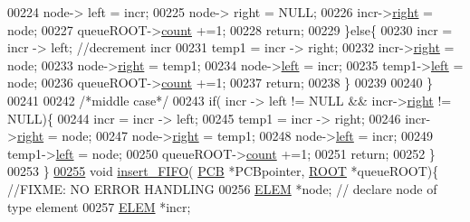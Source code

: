 \begin{DoxyCode}
{{00224                         node-> left = incr;
00225                         node-> right = NULL;
00226                         incr->\hyperlink{structpage_a59bb1b5eca2d579befcc93a2833f4dfd}{right} = node;
00227                         queueROOT->\hyperlink{structroot_afa78d0408d4af29e936332a04739d59c}{count} +=1;
00228                         \textcolor{keywordflow}{return};
00229                 \}\textcolor{keywordflow}{else}\{
00230                         incr = incr -> left; \textcolor{comment}{//decrement incr}
00231                         temp1 = incr -> right;
00232                         incr->\hyperlink{structpage_a59bb1b5eca2d579befcc93a2833f4dfd}{right} = node;
00233                         node->\hyperlink{structpage_a59bb1b5eca2d579befcc93a2833f4dfd}{right} = temp1;
00234                         node->\hyperlink{structpage_a450d16b8cb803158a4dab05bb36fd7f5}{left} = incr;
00235                         temp1->\hyperlink{structpage_a450d16b8cb803158a4dab05bb36fd7f5}{left} = node;
00236                         queueROOT->\hyperlink{structroot_afa78d0408d4af29e936332a04739d59c}{count} +=1;
00237                         \textcolor{keywordflow}{return};
00238                 \}
00239                 
00240         \}
00241         
00242         \textcolor{comment}{/*middle case*/}
00243         \textcolor{keywordflow}{if}( incr -> left != NULL && incr->\hyperlink{structpage_a59bb1b5eca2d579befcc93a2833f4dfd}{right} != NULL)\{
00244                 incr = incr -> left;
00245                 temp1 = incr -> right;
00246                 incr->\hyperlink{structpage_a59bb1b5eca2d579befcc93a2833f4dfd}{right} = node;
00247                 node->\hyperlink{structpage_a59bb1b5eca2d579befcc93a2833f4dfd}{right} = temp1;
00248                 node->\hyperlink{structpage_a450d16b8cb803158a4dab05bb36fd7f5}{left} = incr;
00249                 temp1->\hyperlink{structpage_a450d16b8cb803158a4dab05bb36fd7f5}{left} = node;
00250                 queueROOT->\hyperlink{structroot_afa78d0408d4af29e936332a04739d59c}{count} +=1;
00251                 \textcolor{keywordflow}{return};
00252         \}
00253 \}
\hypertarget{mpx__r2_8c_source_l00255}{}\hyperlink{mpx__r2_8h_a89d5f57a5b157787f44875a8f27a6233}{00255} \textcolor{keywordtype}{void} \hyperlink{mpx__r2_8c_a58a3e3525ed6385f632835b55ab7d7d1}{insert_FIFO}( \hyperlink{structprocess}{PCB} *PCBpointer, \hyperlink{structroot}{ROOT} *queueROOT)\{ \textcolor{comment}{//FIXME: NO ERROR HANDLING}
00256         \hyperlink{structpage}{ELEM} *node; \textcolor{comment}{// declare node of type element}
00257         \hyperlink{structpage}{ELEM} *incr;
}}
\end{DoxyCode}
